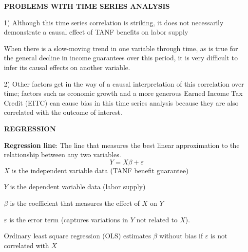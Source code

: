 \documentclass[landscape]{slides}
\begin{document}
\begin{slide}

\end{slide}

\begin{slide}
\begin{center}
{\bf PROBLEMS WITH TIME SERIES ANALYSIS}
\end{center}

1) Although this time series correlation is striking, it does not necessarily demonstrate a causal effect of TANF benefits on labor supply

When there is a slow-moving trend in one variable through time, as is true for the general decline in income guarantees over this period, it is very difficult to infer its causal effects on another variable.

2) Other factors get in the way of a causal interpretation of this correlation over time; factors such as economic growth and a more generous Earned Income Tax Credit (EITC) can cause bias in this time series analysis because they are also correlated with the outcome of interest.
\end{slide}

\begin{slide}

\end{slide}

\begin{slide}

\end{slide}


\begin{slide}
\begin{center}
{\bf REGRESSION}
\end{center}

{\bf Regression line}:
The line that measures the best linear approximation to the relationship between any two variables.
\[Y = X \beta + \varepsilon \]
$X$ is the independent variable data (TANF benefit guarantee)

$Y$ is the dependent variable data (labor supply)

$\beta$ is the coefficient that measures the effect of $X$ on $Y$

$\varepsilon$ is the error term (captures variations in $Y$ not related to $X$).

Ordinary least square regression (OLS) estimates $\beta$ without bias if
$\varepsilon$ is not correlated with $X$

\end{slide}
\end{document}
